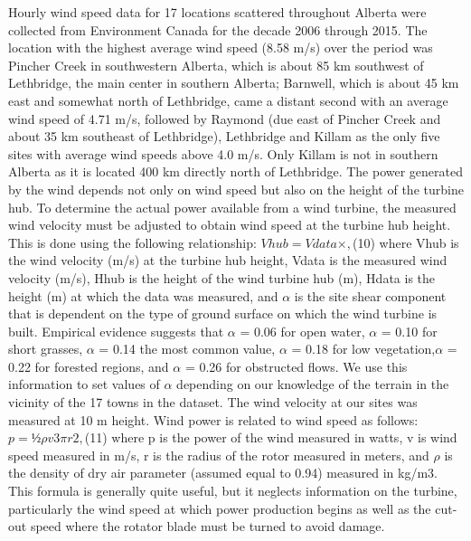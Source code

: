 Hourly wind speed data for 17 locations scattered throughout Alberta were collected from Environment Canada for the decade 2006 through 2015. The location with the highest average wind speed (8.58 m/s) over the period was Pincher Creek in southwestern Alberta, which is about 85 km southwest of Lethbridge, the main center in southern Alberta; Barnwell, which is about 45 km east and somewhat north of Lethbridge, came a distant second with an average wind speed of 4.71 m/s, followed by Raymond (due east of Pincher Creek and about 35 km southeast of Lethbridge), Lethbridge and Killam as the only five sites with average wind speeds above 4.0 m/s. Only Killam is not in southern Alberta as it is located 400 km directly north of Lethbridge. 
The power generated by the wind depends not only on wind speed but also on the height of the turbine hub. To determine the actual power available from a wind turbine, the measured wind velocity must be adjusted to obtain wind speed at the turbine hub height. This is done using the following relationship:
 $Vhub = Vdata ×  ,	$(10)
where Vhub is the wind velocity (m/s) at the turbine hub height, Vdata is the measured wind velocity (m/s), Hhub is the height of the wind turbine hub (m), Hdata is the height (m) at which the data was measured, and $\alpha$ is the site shear component that is dependent on the type of ground surface on which the wind turbine is built. Empirical evidence suggests that $\alpha$  = 0.06 for open water, $\alpha$  = 0.10 for short grasses, $\alpha$  = 0.14 the most common value, $\alpha$  = 0.18 for low vegetation,$\alpha$  = 0.22 for forested regions, and $\alpha$  = 0.26 for obstructed flows. We use this information to set values of $\alpha$ depending on our knowledge of the terrain in the vicinity of the 17 towns in the dataset.  The wind velocity at our sites was measured at 10 m height. 
Wind power is related to wind speed as follows: 
$ p = ½ \rho  v3 \pi  r2, 	$(11)
where p is the power of the wind measured in watts, v is wind speed measured in m/s, r is the radius of the rotor measured in meters, and $\rho$ is the density of dry air parameter (assumed equal to 0.94) measured in kg/m3. This formula is generally quite useful, but it neglects information on the turbine, particularly the wind speed at which power production begins as well as the cut-out speed where the rotator blade must be turned to avoid damage.
